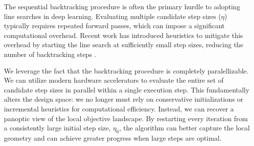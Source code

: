 \documentclass[10pt]{article} %
\newcommand{\stepSize}{\eta}
\newcommand{\stepSizeInit}{\eta_0}
\begin{document}
The sequential backtracking procedure is often the primary hurdle to adopting line searches in deep learning. Evaluating multiple candidate step sizes ($\stepSize$) typically requires repeated forward passes, which can impose a significant computational overhead. Recent work has introduced heuristics to mitigate this overhead by starting the line search at sufficiently small step sizes, reducing the number of backtracking steps \citep{vaswani2019painless,galli2023monotone}. 

We leverage the fact that the backtracking procedure is completely paralellizable.
We can utilize modern hardware accelerators to evaluate the entire set of candidate step sizes in parallel within a single execution step. This fundamentally alters the design space: we  no longer must rely on conservative initializations or incremental heuristics for computational efficiency. Instead, we can recover a panoptic view of the local objective landscape. By restarting every iteration from a consistently large initial step size, $\stepSizeInit$, the algorithm can better capture the local geometry and can achieve greater progress when large steps are optimal. 
\end{document}

